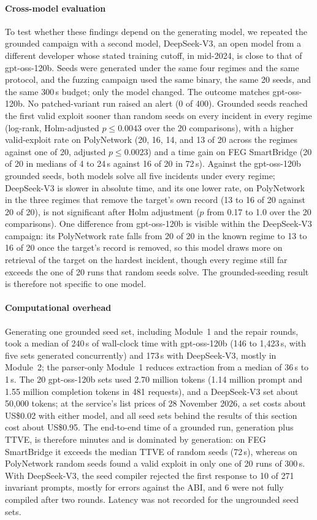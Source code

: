 \documentclass[a4paper]{cas-sc}
\begin{document}
\paragraph{Cross-model evaluation}
To test whether these findings depend on the generating model, we repeated the grounded campaign with a second model, DeepSeek-V3, an open model from a different developer whose stated training cutoff, in mid-2024, is close to that of gpt-oss-120b. Seeds were generated under the same four regimes and the same protocol, and the fuzzing campaign used the same binary, the same 20 seeds, and the same 300\,s budget; only the model changed. The outcome matches gpt-oss-120b. No patched-variant run raised an alert (0 of 400). Grounded seeds reached the first valid exploit sooner than random seeds on every incident in every regime (log-rank, Holm-adjusted $p \le 0.0043$ over the 20 comparisons), with a higher valid-exploit rate on PolyNetwork (20, 16, 14, and 13 of 20 across the regimes against one of 20, adjusted $p \le 0.0023$) and a time gain on FEG SmartBridge (20 of 20 in medians of 4 to 24\,s against 16 of 20 in 72\,s). Against the gpt-oss-120b grounded seeds, both models solve all five incidents under every regime; DeepSeek-V3 is slower in absolute time, and its one lower rate, on PolyNetwork in the three regimes that remove the target's own record (13 to 16 of 20 against 20 of 20), is not significant after Holm adjustment ($p$ from 0.17 to 1.0 over the 20 comparisons). One difference from gpt-oss-120b is visible within the DeepSeek-V3 campaign: its PolyNetwork rate falls from 20 of 20 in the known regime to 13 to 16 of 20 once the target's record is removed, so this model draws more on retrieval of the target on the hardest incident, though every regime still far exceeds the one of 20 runs that random seeds solve. The grounded-seeding result is therefore not specific to one model.

\paragraph{Computational overhead}
Generating one grounded seed set, including Module~1 and the repair rounds, took a median of 240\,s of wall-clock time with gpt-oss-120b (146 to 1,423\,s, with five sets generated concurrently) and 173\,s with DeepSeek-V3, mostly in Module~2; the parser-only Module~1 reduces extraction from a median of 36\,s to 1\,s. The 20 gpt-oss-120b sets used 2.70 million tokens (1.14 million prompt and 1.55 million completion tokens in 481 requests), and a DeepSeek-V3 set about 50{,}000 tokens; at the service's list prices of 28 November 2026, a set costs about US\$0.02 with either model, and all seed sets behind the results of this section cost about US\$0.95. The end-to-end time of a grounded run, generation plus TTVE, is therefore minutes and is dominated by generation: on FEG SmartBridge it exceeds the median TTVE of random seeds (72\,s), whereas on PolyNetwork random seeds found a valid exploit in only one of 20 runs of 300\,s. With DeepSeek-V3, the seed compiler rejected the first response to 10 of 271 invariant prompts, mostly for errors against the ABI, and 6 were not fully compiled after two rounds. Latency was not recorded for the ungrounded seed sets.
\end{document}
